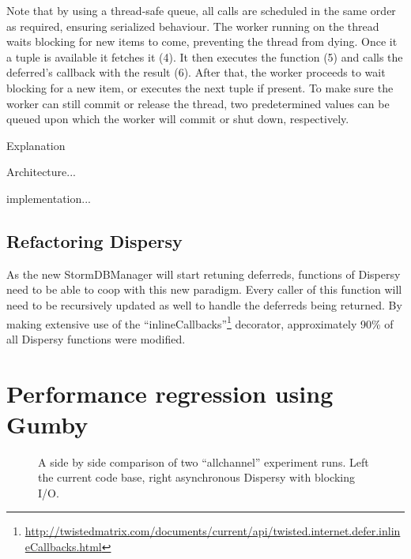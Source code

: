 Note that by using a thread-safe queue, all calls are scheduled in the same order as required, ensuring serialized behaviour.
The worker running on the thread waits blocking for new items to come, preventing the thread from dying.
Once it a tuple is available it fetches it (4).
It then executes the function (5) and calls the deferred's callback with the result (6).
After that, the worker proceeds to wait blocking for a new item, or executes the next tuple if present.
To make sure the worker can still commit or release the thread, two predetermined values can be queued upon which the worker will commit or shut down, respectively.

Explanation

Architecture...

implementation...

\subsection{Refactoring Dispersy}

As the new StormDBManager will start retuning deferreds, functions of Dispersy need to be able to coop with this new paradigm.
Every caller of this function will need to be recursively updated as well to handle the deferreds being returned.
By making extensive use of the \enquote{inlineCallbacks}\footnote{\url{http://twistedmatrix.com/documents/current/api/twisted.internet.defer.inlineCallbacks.html}} decorator, approximately 90\% of all Dispersy functions were modified. 

\section{Performance regression using Gumby}

\begin{figure}[h]
	\caption{A side by side comparison of two \enquote{allchannel} experiment runs. Left the current code base, right asynchronous Dispersy with blocking I/O.}
	\label{fig:side_by_side_send}
\end{figure} 

